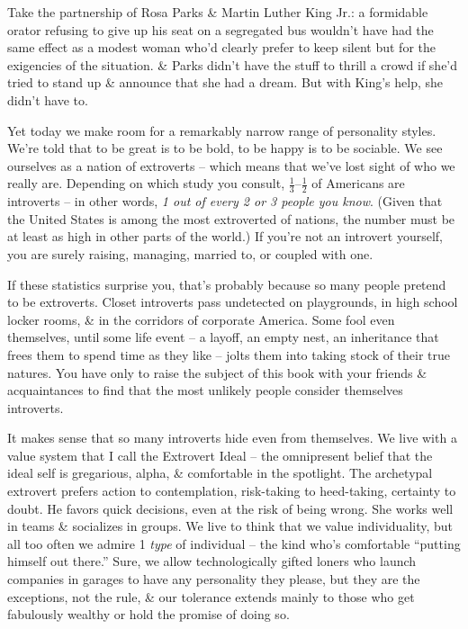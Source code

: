 \documentclass{article}
\numberwithin{equation}{section}
\begin{document}
Take the partnership of Rosa Parks \& Martin Luther King Jr.: a formidable orator refusing to give up his seat on a segregated bus wouldn't have had the same effect as a modest woman who'd clearly prefer to keep silent but for the exigencies of the situation. \& Parks didn't have the stuff to thrill a crowd if she'd tried to stand up \& announce that she had a dream. But with King's help, she didn't
have to.

Yet today we make room for a remarkably narrow range of personality styles. We're told that to be great is to be bold, to be happy is to be sociable. We see ourselves as a nation of extroverts -- which means that we've lost sight of who we really are. Depending on which study you consult, $\frac{1}{3}$--$\frac{1}{2}$ of Americans are introverts -- in other words, \textit{1 out of every 2 or 3 people you know}. (Given that the United States is among the most extroverted of nations, the number must be at least as high in other parts of the world.) If you're not an introvert yourself, you are surely raising, managing, married to, or coupled with one.

If these statistics surprise you, that's probably because so many people pretend to be extroverts. Closet introverts pass undetected on playgrounds, in high school locker rooms, \& in the corridors of corporate America. Some fool even themselves, until some life event -- a layoff, an empty nest, an inheritance that frees them to spend time as they like -- jolts them into taking stock of their true natures. You have only to raise the subject of this book with your friends \& acquaintances to find that the most unlikely people consider themselves introverts.

It makes sense that so many introverts hide even from themselves. We live with a value system that I call the Extrovert Ideal -- the omnipresent belief that the ideal self is gregarious, alpha, \& comfortable in the spotlight. The archetypal extrovert prefers action to contemplation, risk-taking to heed-taking, certainty to doubt. He favors quick decisions, even at the risk of being wrong. She works well in teams \& socializes in groups. We live to think that we value individuality, but all too often we admire 1 \textit{type} of individual -- the kind who's comfortable ``putting himself out there.'' Sure, we allow technologically gifted loners who launch companies in garages to have any personality they please, but they are the exceptions, not the rule, \& our tolerance extends mainly to those who get fabulously wealthy or hold the promise of doing so.
\end{document}
